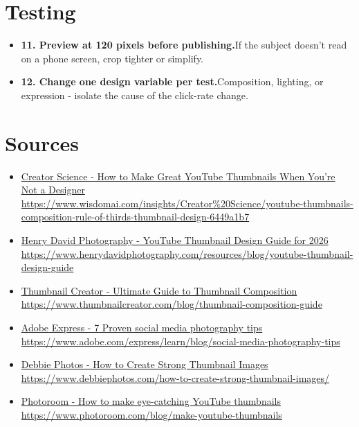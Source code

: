 \documentclass[11pt]{article}
\newcommand{\tip}[2]{\item \textbf{#1.}\enspace #2}
\newcommand{\tlabel}{\textcolor{accent}{\small$\blacktriangleright$}}
\begin{document}
\section*{Testing}
\begin{itemize}[label=\tlabel]
\tip{11. Preview at 120 pixels before publishing}{If the subject doesn't read on a phone screen, crop tighter or simplify.}
\tip{12. Change one design variable per test}{Composition, lighting, or expression - isolate the cause of the click-rate change.}
\end{itemize}
\section*{Sources}
\begin{itemize}[label={},leftmargin=0.9em,itemsep=1pt]
\footnotesize
\item \href{https://www.wisdomai.com/insights/Creator%20Science/youtube-thumbnails-composition-rule-of-thirds-thumbnail-design-6449a1b7}{Creator Science - How to Make Great YouTube Thumbnails When You're Not a Designer} \\ {\color{softgray}\url{https://www.wisdomai.com/insights/Creator%20Science/youtube-thumbnails-composition-rule-of-thirds-thumbnail-design-6449a1b7}}
\item \href{https://www.henrydavidphotography.com/resources/blog/youtube-thumbnail-design-guide}{Henry David Photography - YouTube Thumbnail Design Guide for 2026} \\ {\color{softgray}\url{https://www.henrydavidphotography.com/resources/blog/youtube-thumbnail-design-guide}}
\item \href{https://www.thumbnailcreator.com/blog/thumbnail-composition-guide}{Thumbnail Creator - Ultimate Guide to Thumbnail Composition} \\ {\color{softgray}\url{https://www.thumbnailcreator.com/blog/thumbnail-composition-guide}}
\item \href{https://www.adobe.com/express/learn/blog/social-media-photography-tips}{Adobe Express - 7 Proven social media photography tips} \\ {\color{softgray}\url{https://www.adobe.com/express/learn/blog/social-media-photography-tips}}
\item \href{https://www.debbiephotos.com/how-to-create-strong-thumbnail-images/}{Debbie Photos - How to Create Strong Thumbnail Images} \\ {\color{softgray}\url{https://www.debbiephotos.com/how-to-create-strong-thumbnail-images/}}
\item \href{https://www.photoroom.com/blog/make-youtube-thumbnails}{Photoroom - How to make eye-catching YouTube thumbnails} \\ {\color{softgray}\url{https://www.photoroom.com/blog/make-youtube-thumbnails}}
\end{itemize}
\normalsize
\end{document}
